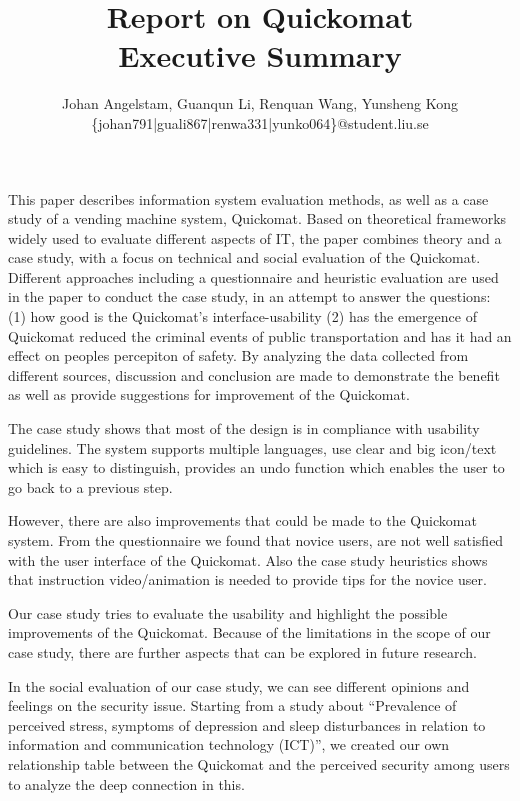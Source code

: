 \documentclass[twocolumn]{article}
\title{Report on Quickomat \\ Executive Summary}
\author{Johan Angelstam, Guanqun Li, Renquan Wang, Yunsheng Kong\\
  \{johan791|guali867|renwa331|yunko064\}@student.liu.se}
\begin{document}
\twocolumn[
  \begin{@twocolumnfalse}
    \maketitle
    \vspace{2em}
  \end{@twocolumnfalse}
  ]
  
This paper describes information system evaluation methods, as well as a case study of a vending machine system, Quickomat. Based on theoretical frameworks widely used to evaluate different aspects of IT, the paper combines theory and a case study, with a focus on technical and social evaluation of the Quickomat. Different approaches including a questionnaire and heuristic evaluation are used in the paper to conduct the case study, in an attempt to answer the questions: (1) how good is the Quickomat's interface-usability (2) has the emergence of Quickomat reduced the criminal events of public transportation and has it had an effect on peoples percepiton of safety. By analyzing the data collected from different sources, discussion and conclusion are made to demonstrate the benefit as well as provide suggestions for improvement of the Quickomat.

The case study shows that most of the design is in compliance with usability guidelines. The system supports multiple languages, use clear and big icon/text which is easy to distinguish, provides an undo function which enables the user to go back to a previous step.

However, there are also improvements that could be made to the Quickomat system. From the questionnaire we found that novice users, are not well satisfied with the user interface of the Quickomat. Also the case study heuristics shows that instruction video/animation is needed to provide tips for the novice user.

Our case study tries to evaluate the usability and highlight the possible improvements of the Quickomat. Because of the limitations in the scope of our case study, there are further aspects that can be explored in future research.

In the social evaluation of our case study, we can see different opinions and feelings on the security issue. Starting from a study about “Prevalence of perceived stress, symptoms of depression and sleep disturbances in relation to information and communication technology (ICT)”, we created our own relationship table between the Quickomat and the perceived security among users to analyze the deep connection in this.
\end{document}
